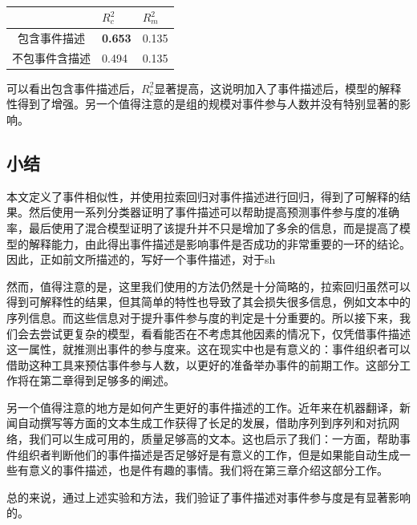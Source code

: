 \begin{table}[htbp]
	\centering
  \caption{}
  \label{t3}
	\begin{tabular}{cll}
		\hline
                           &  \(R_c^2\) & \(R_m^2\) \\ 
    \hline
		包含事件描述                       & \textbf{0.653} & 0.135 \\ 
    不包事件含描述                        & 0.494 & 0.135 \\ 
    \hline
	\end{tabular}
\end{table}

可以看出包含事件描述后，\(R_c^2\)显著提高，这说明加入了事件描述后，模型的解释性得到了增强。另一个值得注意的是组的规模对事件参与人数并没有特别显著的影响。

\subsection{小结}
本文定义了事件相似性，并使用拉索回归对事件描述进行回归，得到了可解释的结果。然后使用一系列分类器证明了事件描述可以帮助提高预测事件参与度的准确率，最后使用了混合模型证明了该提升并不只是增加了多余的信息，而是提高了模型的解释能力，由此得出事件描述是影响事件是否成功的非常重要的一环的结论。因此，正如前文所描述的，写好一个事件描述，对于sh

然而，值得注意的是，这里我们使用的方法仍然是十分简略的，拉索回归虽然可以得到可解释性的结果，但其简单的特性也导致了其会损失很多信息，例如文本中的序列信息。而这些信息对于提升事件参与度的判定是十分重要的。所以接下来，我们会去尝试更复杂的模型，看看能否在不考虑其他因素的情况下，仅凭借事件描述这一属性，就推测出事件的参与度来。这在现实中也是有意义的：事件组织者可以借助这种工具来预估事件参与人数，以更好的准备举办事件的前期工作。这部分工作将在第二章得到足够多的阐述。

另一个值得注意的地方是如何产生更好的事件描述的工作。近年来在机器翻译，新闻自动撰写等方面的文本生成工作获得了长足的发展，借助序列到序列和对抗网络，我们可以生成可用的，质量足够高的文本。这也启示了我们：一方面，帮助事件组织者判断他们的事件描述是否足够好是有意义的工作，但是如果能自动生成一些有意义的事件描述，也是件有趣的事情。我们将在第三章介绍这部分工作。

总的来说，通过上述实验和方法，我们验证了事件描述对事件参与度是有显著影响的。

% 